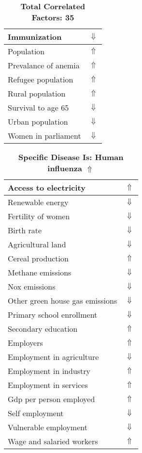 \documentclass[12pt,notitlepage,oneside]{report}
\begin{document}
\begin{table}[!htb]
\begin{tabular}{|l|l|}
Immunization & $\Downarrow$\\ \hline
Population & $\Uparrow$\\ \hline
Prevalance of anemia & $\Uparrow$\\ \hline
Refugee population & $\Uparrow$\\ \hline
Rural population & $\Uparrow$\\ \hline
Survival to age 65 & $\Downarrow$\\ \hline
Urban population & $\Downarrow$\\ \hline
Women in parliament & $\Downarrow$\\ \hline
\end{tabular}
\caption*{\textbf{Total Correlated Factors: 35}}
\end{table}
\clearpage
\begin{table}[!htb]
\caption{\textbf{Specific Disease Is: Human influenza $\Uparrow$}}
\centering
\label{Correlated Socio-economic Factors0}
\begin{tabular}{|l|l|}
\hline
Access to electricity & $\Uparrow$\\ \hline
Renewable energy & $\Downarrow$\\ \hline
Fertility of women & $\Downarrow$\\ \hline
Birth rate & $\Downarrow$\\ \hline
Agricultural land & $\Downarrow$\\ \hline
Cereal production & $\Uparrow$\\ \hline
Methane emissions & $\Downarrow$\\ \hline
Nox emissions & $\Downarrow$\\ \hline
Other green house gas emissions & $\Downarrow$\\ \hline
Primary school enrollment & $\Downarrow$\\ \hline
Secondary education & $\Uparrow$\\ \hline
Employers & $\Uparrow$\\ \hline
Employment in agriculture & $\Downarrow$\\ \hline
Employment in industry & $\Uparrow$\\ \hline
Employment in services & $\Uparrow$\\ \hline
Gdp per person employed & $\Uparrow$\\ \hline
Self employment & $\Downarrow$\\ \hline
Vulnerable employment & $\Downarrow$\\ \hline
Wage and salaried workers & $\Uparrow$\\ \hline

\end{tabular}
\end{table}
\end{document}
